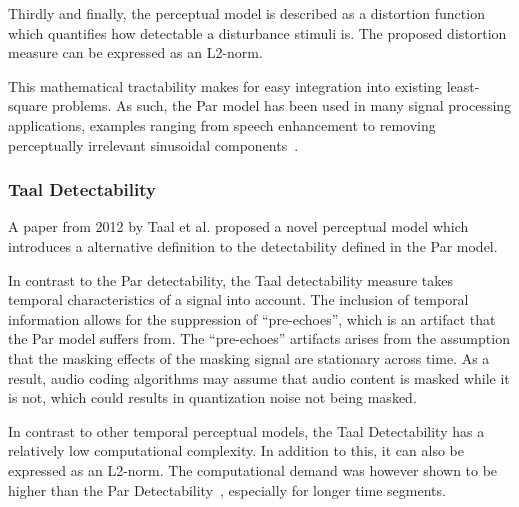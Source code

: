 Thirdly and finally, the perceptual model is described as a distortion function which quantifies how 
detectable a disturbance stimuli is.
The proposed distortion measure can be expressed as an L2-norm.

This mathematical tractability makes for easy integration into existing least-square problems.
As such, the Par model has been used in many signal processing applications, 
examples ranging from speech enhancement to removing perceptually irrelevant sinusoidal 
components~\cite{balazs2009time, taal2013optimal}.

\subsubsection{Taal Detectability}
A paper from 2012 by Taal et al. proposed a novel perceptual model \cite{taal2012low} which introduces a
alternative definition to the detectability defined in the Par model.

In contrast to the Par detectability, the Taal detectability measure takes temporal characteristics of a signal into account.
The inclusion of temporal information allows for the suppression of ``pre-echoes'', which is an artifact that 
the Par model suffers from. 
The ``pre-echoes'' artifacts arises from the assumption that the masking effects of the masking signal are stationary across 
time. 
As a result, audio coding algorithms may assume that audio content is masked while it is not, which could results in quantization
noise not being masked.

In contrast to other temporal perceptual models, the Taal Detectability has a relatively low computational complexity.
In addition to this, it can also be expressed as an L2-norm.
The computational demand was however shown to be higher than the Par Detectability~\cite{taal2012low}, especially for longer time segments.
